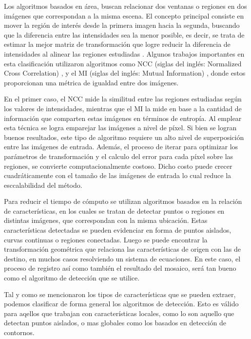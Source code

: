 
Los algoritmos basados en área, buscan relacionar dos ventanas o regiones en dos imágenes que correspondan a la misma escena. El concepto principal consiste en mover la región de interés desde la primera imagen hacia la segunda, buscando que la diferencia entre las intensidades sea la menor posible, es decir,  se trata de estimar la mejor matriz de transformación que logre reducir la diferencia de intensidades al alinear las regiones estudiadas \cite{nccvsmi}. Algunos trabajos importantes en esta clasificación utilizaron algoritmos como NCC (siglas del inglés: Normalized Cross Correlation) \cite{ncc}, y el MI (siglas del inglés: Mutual Information) \cite{mi}, donde estos proporcionan una métrica de igualdad entre dos imágenes.

En el primer caso, el NCC mide la similitud entre las regiones estudiadas según los valores de intensidades, mientras que el MI la mide en base a la cantidad de información que comparten estas imágenes en términos de entropía. Al emplear esta técnica se logra emparejar las imágenes a nivel de píxel. Si bien se logran buenos resultados, este tipo de algoritmo requiere un alto nivel de superposición entre las imágenes de entrada. Además, el proceso de iterar para optimizar los parámetros de transformación y el calculo del error para cada píxel sobre las regiones, se convierte computacionalmente costoso. Dicho costo puede crecer cuadráticamente con el tamaño de las imágenes de entrada lo cual reduce la esccalabilidad del método.



Para reducir el tiempo de cómputo se utilizan algoritmos basados en la relación de características, en los cuales se tratan de detectar puntos o regiones en distintas imágenes, que correspondan con la misma ubicación. Estas características detectadas se pueden evidenciar en forma de puntos aislados, curvas continuas o regiones conectadas. Luego se puede encontrar la transformación geométrica que relaciona las características de origen con las de destino, en muchos casos resolviendo un sistema de ecuaciones. En este caso, el proceso de registro así como también el resultado del mosaico, será tan bueno como el algoritmo de detección que se utilice.

Tal y como se mencionaron los tipos de características que se pueden extraer, podemos clasificar de forma general los algoritmos de detección. Esto es válido para aqellos que trabajan con características locales, como lo son aquello que detectan puntos aislados, o mas globales como los basados en detección de contornos.

